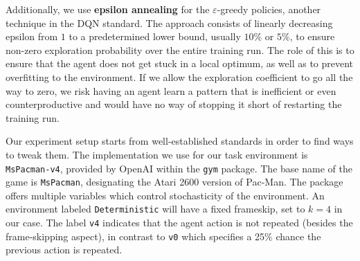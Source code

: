 
Additionally, we use \textbf{epsilon annealing} for the $\varepsilon$-greedy policies, another technique in the DQN standard.
The approach consists of linearly decreasing epsilon from $1$ to a predetermined lower bound, usually $10\%$ or $5\%$, to ensure non-zero exploration probability over the entire training run.
The role of this is to ensure that the agent does not get stuck in a local optimum, as well as to prevent overfitting to the environment.
If we allow the exploration coefficient to go all the way to zero, we risk having an agent learn a pattern that is inefficient or even counterproductive and would have no way of stopping it short of restarting the training run.

Our experiment setup starts from well-established standards in order to find ways to tweak them.
The implementation we use for our task environment is \texttt{MsPacman-v4}, provided by OpenAI within the \texttt{gym} package.
The base name of the game is \texttt{MsPacman}, designating the Atari 2600 version of Pac-Man.
The package offers multiple variables which control stochasticity of the environment.
An environment labeled \texttt{Deterministic} will have a fixed frameskip, set to $k = 4$ in our case.
The label \texttt{v4} indicates that the agent action is not repeated (besides the frame-skipping aspect), in contrast to \texttt{v0} which specifies a 25\% chance the previous action is repeated.

